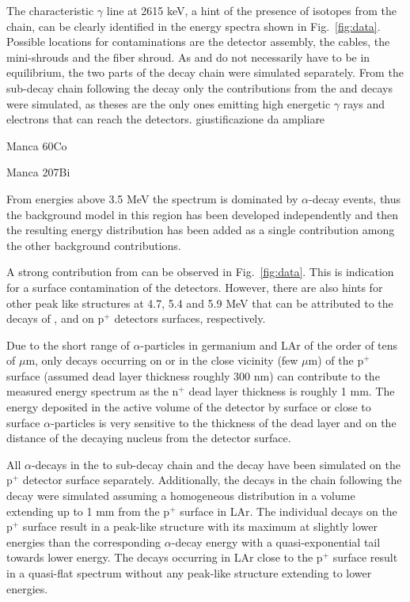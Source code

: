  The characteristic $\gamma$ line at 2615 keV, a hint of the presence of isotopes from the  chain, can be clearly identified in the energy spectra shown in Fig.~\ref{fig:data}. Possible locations for contaminations are the detector assembly, the cables, the mini-shrouds and the fiber shroud. As  and  do not necessarily have to be in equilibrium, the two parts of the decay chain were simulated separately. From the sub-decay chain following the  decay only the contributions from the  and  decays were simulated, as theses are the only ones emitting high energetic $\gamma$ rays and electrons that can reach the detectors. {\color{red}giustificazione da ampliare}

{\color{red}Manca 60Co}%

{\color{red}Manca 207Bi}%

 From energies above 3.5 MeV the spectrum is dominated by $\alpha$-decay events, thus the background model in this region has been developed independently and then the resulting energy distribution has been added as a single contribution among the other background contributions.

A strong contribution from  can be observed in Fig.~\ref{fig:data}. This is indication for a surface contamination of the detectors. However, there are also hints for other peak like structures at 4.7, 5.4 and 5.9 MeV that can be attributed to the decays of ,  and  on p$^+$ detectors surfaces, respectively.

Due to the short range of $\alpha$-particles in germanium and LAr of the order of tens of $\mu$m, only decays occurring on or in the close vicinity (few $\mu$m) of the p$^+$ surface (assumed dead layer thickness roughly 300 nm) can contribute to the measured energy spectrum as the n$^+$ dead layer thickness is roughly 1 mm. The energy deposited in the active volume of the detector by surface or close to surface $\alpha$-particles is very sensitive to the thickness of the dead layer and on the distance of the decaying nucleus from the detector surface.

All $\alpha$-decays in the  to  sub-decay chain and the  decay have been simulated on the p$^+$ detector surface separately. Additionally, the decays in the chain following the  decay were simulated assuming a homogeneous distribution in a volume extending up to 1 mm from the p$^+$ surface in LAr. The individual decays on the p$^+$ surface result in a peak-like structure with its maximum at slightly lower energies than the corresponding $\alpha$-decay energy with a quasi-exponential tail towards lower energy. The decays occurring in LAr close to the p$^+$ surface result in a quasi-flat spectrum without any peak-like structure extending to lower energies.

